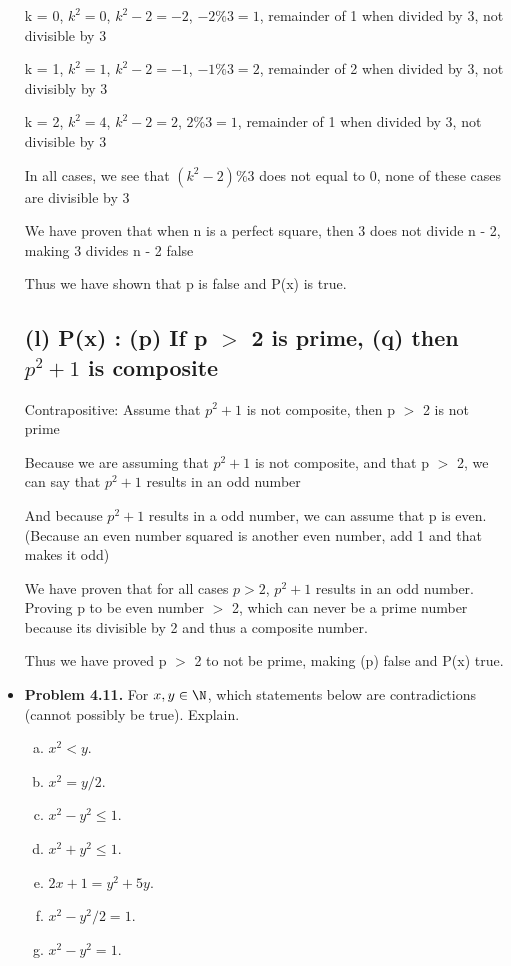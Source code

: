 \documentclass[11pt]{article}
\begin{document}
\begin{itemize}
  k = 0, \(k^2 = 0\), \(k^2-2=-2\), \(-2 \% 3 = 1\), remainder of 1 when divided by 3, not divisible by 3
  
  k = 1, \(k^2 = 1\), \(k^2-2=-1\), \(-1 \% 3 = 2\), remainder of 2 when divided by 3, not divisibly by 3

  k = 2, \(k^2 = 4\), \(k^2-2=2\), \(2 \% 3 = 1\), remainder of 1 when divided by 3, not divisible by 3

  In all cases, we see that \((k^2-2)\%3\) does not equal to 0, none of these cases are divisible by 3

  We have proven that when n is a perfect square, then 3 does not divide n - 2, making 3 divides n - 2 false

  Thus we have shown that p is false and P(x) is true.

  \subsection*{(l) P(x) : (p) If p $>$ 2 is prime, (q) then \(p^2+1\) is composite}
  
  Contrapositive: Assume that \(p^2+1\) is not composite, then p $>$ 2 is not prime

  Because we are assuming that $p^2 + 1$ is not composite, and that p $>$ 2, we can say that $p^2 + 1$ results in an odd number

  And because $p^2 + 1$ results in a odd number, we can assume that p is even. (Because an even number squared is another even number, add 1 and that makes it odd)

  We have proven that for all cases $p > 2$, $p^2 + 1$ results in an odd number. Proving p to be even number $>$ 2, which can never be a prime number because its divisible by 2 and thus a composite number.

  Thus we have proved p $>$ 2 to not be prime, making (p) false and P(x) true.

\vspace{0.1in}

\item \textbf{Problem 4.11.}
  For $x,y\in\N$, which statements below are contradictions (cannot possibly be true).
  Explain.
  \begin{enumerate}[(a)]
  \item $x^2<y$.
  \item $x^2=y/2$.
  \item $x^2-y^2\le 1$.
  \item $x^2+y^2\le 1$.
  \item $2x+1=y^2+5y$.
  \item $x^2-y^2/2=1$.
  \item $x^2-y^2=1$.
  \end{enumerate}


\end{itemize}
\end{document}
